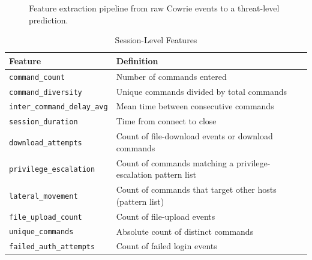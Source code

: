 \documentclass[conference]{IEEEtran}
\begin{document}
\begin{figure}[t]
\centering
{}
\caption{Feature extraction pipeline from raw Cowrie events to a threat-level prediction.}
\label{fig:pipe}
\end{figure}

\begin{table}[t]
\centering
\caption{Session-Level Features}
\label{tab:sess}
\footnotesize
\begin{tabular}{@{}p{2.9cm}p{5.3cm}@{}}
\toprule
Feature & Definition \\
\midrule
\texttt{command\_\allowbreak{}count} & Number of commands entered \\
\texttt{command\_\allowbreak{}diversity} & Unique commands divided by total commands \\
\texttt{inter\_\allowbreak{}command\_\allowbreak{}delay\_\allowbreak{}avg} & Mean time between consecutive commands \\
\texttt{session\_\allowbreak{}duration} & Time from connect to close \\
\texttt{download\_\allowbreak{}attempts} & Count of file-download events or download commands \\
\texttt{privilege\_\allowbreak{}escalation} & Count of commands matching a privilege-escalation pattern list \\
\texttt{lateral\_\allowbreak{}movement} & Count of commands that target other hosts (pattern list) \\
\texttt{file\_\allowbreak{}upload\_\allowbreak{}count} & Count of file-upload events \\
\texttt{unique\_\allowbreak{}commands} & Absolute count of distinct commands \\
\texttt{failed\_\allowbreak{}auth\_\allowbreak{}attempts} & Count of failed login events \\
\bottomrule
\end{tabular}
\end{table}
\end{document}
